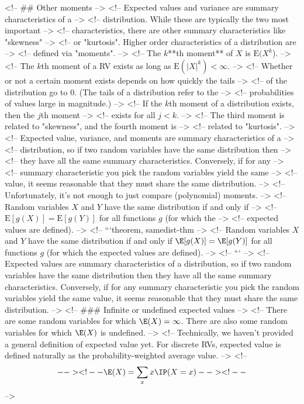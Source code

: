 <!-- ## Other moments -->
<!-- Expected values and variance are summary characteristics of a -->
<!-- distribution. While these are typically the two most important -->
<!-- characteristics, there are other summary characteristics like "skewness" -->
<!-- or "kurtosis". Higher order characteristics of a distribution are -->
<!-- defined via "moments". -->
<!-- The $k$**th moment** of $X$ is $\textrm{E}(X^k$). -->
<!-- The $k$th moment of a RV exists as long as $\textrm{E}(|X|^k)<\infty$. -->
<!-- Whether or not a certain moment exists depends on how quickly the tails -->
<!-- of the distribution go to 0. (The tails of a distribution refer to the -->
<!-- probabilities of values large in magnitude.) -->
<!-- If the $k$th moment of a distribution exists, then the $j$th moment -->
<!-- exists for all $j<k$. -->
<!-- The third moment is related to "skewness", and the fourth moment is -->
<!-- related to "kurtosis". -->
<!-- Expected value, variance, and moments are summary characteristics of a -->
<!-- distribution, so if two random variables have the same distribution then -->
<!-- they have all the same summary characteristics. Conversely, if for any -->
<!-- summary characteristic you pick the random variables yield the same -->
<!-- value, it seems reasonable that they must share the same distribution. -->
<!-- Unfortunately, it's not enough to just compare (polynomial) moments. -->
<!-- Random variables $X$ and $Y$ have the same distribution if and only if -->
<!-- $\textrm{E}[g(X)]=\textrm{E}[g(Y)]$ for all functions $g$ (for which the -->
<!-- expected values are defined). -->
<!-- ```{theorem, samedist-thm} -->
<!-- Random variables $X$ and $Y$ have the same distribution if and only if $\E[g(X)]=\E[g(Y)]$ for all functions $g$ (for which the expected values are defined). -->
<!-- ``` -->
<!-- Expected values are summary characteristics of a distribution, so if two random variables have the same distribution then they have all the same summary characteristics.  Conversely, if for any summary characteristic you pick the random variables yield the same value, it seems reasonable that they must share the same distribution. -->
<!-- ### Infinite or undefined expected values -->
<!-- There are some random variables for which $\E(X)=\infty$. There are also some random variables for which $\E(X)$ is undefined. -->
<!-- Technically, we haven't provided a general definition of expected value yet.  For discrete RVs, expected value is defined naturally as the probability-weighted average value. -->
<!-- \[ -->
<!-- \E(X) = \sum_x x \IP(X=x) -->
<!-- \] -->
